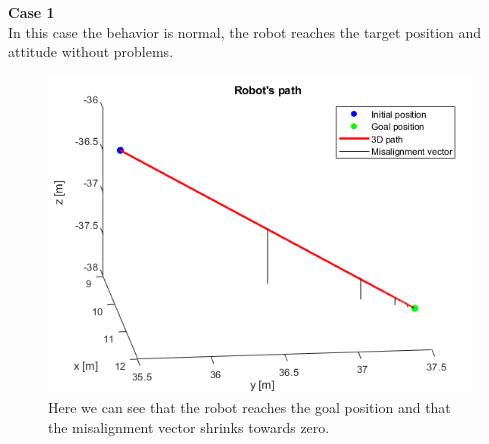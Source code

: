 \documentclass{article}
\begin{document}
{\large \textbf{Case 1}} \\
In this case the behavior is normal, the robot reaches the target position and attitude without problems.
\begin{figure}[H]
	\centering
	\hspace{10mm}
	\label{fig:q2case1ab}
\end{figure}
\begin{figure}[H]
	\centering
	\includegraphics[scale=0.55]{images/Ex1/HorAtt_Disabled_SameStartpos_SameEndpos_Path}
	\caption{Here we can see that the robot reaches the goal position and that the misalignment vector shrinks towards zero.}
	\label{fig:q2case1c}
\end{figure}
\end{document}
